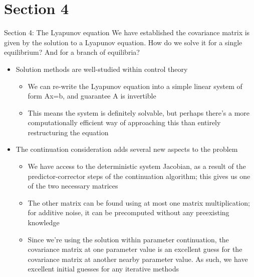 \documentclass[presentation]{beamer}
\begin{document}
\section{Section 4}
\label{sec:org95acb9f}
\begin{frame}[label={sec:org7fd8074},plain]{Section 4: The Lyapunov equation}
We have established the covariance matrix is given by the solution to a Lyapunov equation. How do we solve it for a single equilibrium? And for a branch of equilibria?

\begin{itemize}
\item Solution methods are well-studied within control theory
\begin{itemize}
\item We can re-write the Lyapunov equation into a simple linear system of form Ax=b, and guarantee A is invertible
\item This means the system is definitely solvable, but perhaps there's a more computationally efficient way of approaching this than entirely restructuring the equation
\end{itemize}
\end{itemize}

\vfill
\begin{itemize}
\item The continuation consideration adds several new aspects to the problem
\begin{itemize}
\item We have access to the deterministic system Jacobian, as a result of the predictor-corrector steps of the continuation algorithm; this gives us one of the two necessary matrices
\item The other matrix can be found using at most one matrix multiplication; for additive noise, it can be precomputed without any preexisting knowledge
\item Since we're using the solution within parameter continuation, the covariance matrix at one parameter value is an excellent guess for the covariance matrix at another nearby parameter value. As such, we have excellent initial guesses for any iterative methods
\end{itemize}
\end{itemize}


\end{frame}
\end{document}
